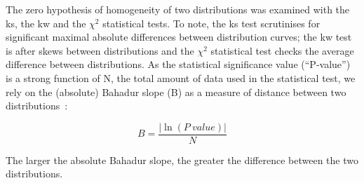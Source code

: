 The zero hypothesis of homogeneity of two distributions was examined with the \gls{ks}, the \gls{kw} and the \({\chi}^{2}\) statistical tests. To note, the \gls{ks} test scrutinises for significant maximal absolute differences between distribution curves; the \gls{kw} test is after skews between distributions and the \({\chi}^{2}\) statistical test checks the average difference between distributions. As the statistical significance value (``P‑value'') is a strong function of N, the total amount of data used in the statistical test, we rely on the (absolute) Bahadur slope (B) as a measure of distance between two distributions~\cite{Bahadur1967, Bahadur1971}:

\begin{equation} \label{eq:bahadur}
B=\frac{|\ln(P~value)|}{N}
\end{equation}

The larger the absolute Bahadur slope, the greater the difference between the two distributions.
